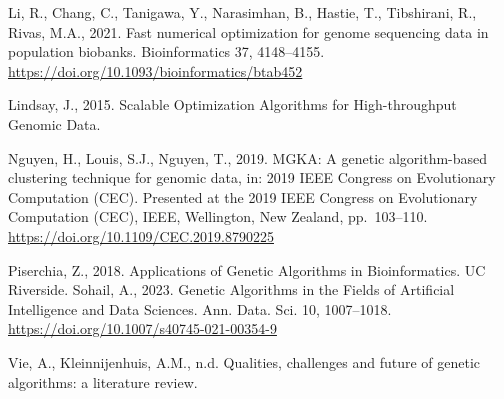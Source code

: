 \documentclass[
]{article}
\begin{document}
Li, R., Chang, C., Tanigawa, Y., Narasimhan, B., Hastie, T., Tibshirani,
R., Rivas, M.A., 2021. Fast numerical optimization for genome sequencing
data in population biobanks. Bioinformatics 37, 4148--4155.
\url{https://doi.org/10.1093/bioinformatics/btab452}

Lindsay, J., 2015. Scalable Optimization Algorithms for High-throughput
Genomic Data.

Nguyen, H., Louis, S.J., Nguyen, T., 2019. MGKA: A genetic
algorithm-based clustering technique for genomic data, in: 2019 IEEE
Congress on Evolutionary Computation (CEC). Presented at the 2019 IEEE
Congress on Evolutionary Computation (CEC), IEEE, Wellington, New
Zealand, pp.~103--110. \url{https://doi.org/10.1109/CEC.2019.8790225}

Piserchia, Z., 2018. Applications of Genetic Algorithms in
Bioinformatics. UC Riverside. Sohail, A., 2023. Genetic Algorithms in
the Fields of Artificial Intelligence and Data Sciences. Ann. Data. Sci.
10, 1007--1018. \url{https://doi.org/10.1007/s40745-021-00354-9}

Vie, A., Kleinnijenhuis, A.M., n.d. Qualities, challenges and future of
genetic algorithms: a literature review.
\end{document}
